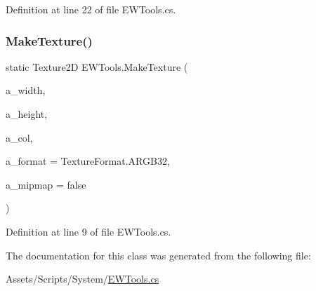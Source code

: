 Definition at line 22 of file E\+W\+Tools.\+cs.

\mbox{\label{class_e_w_tools_a89000b0bd5af7cad18643ea6e1bcc661}} 
\subsubsection{\texorpdfstring{Make\+Texture()}{MakeTexture()}}
{\footnotesize\ttfamily static Texture2D E\+W\+Tools.\+Make\+Texture (\begin{DoxyParamCaption}\item[{int}]{a\+\_\+width,  }\item[{int}]{a\+\_\+height,  }\item[{Color}]{a\+\_\+col,  }\item[{Texture\+Format}]{a\+\_\+format = {\ttfamily TextureFormat.ARGB32},  }\item[{bool}]{a\+\_\+mipmap = {\ttfamily false} }\end{DoxyParamCaption})\hspace{0.3cm}{\ttfamily [static]}}



Definition at line 9 of file E\+W\+Tools.\+cs.



The documentation for this class was generated from the following file\+:\begin{DoxyCompactItemize}
\item 
Assets/\+Scripts/\+System/\mbox{\hyperlink{_e_w_tools_8cs}{E\+W\+Tools.\+cs}}\end{DoxyCompactItemize}
